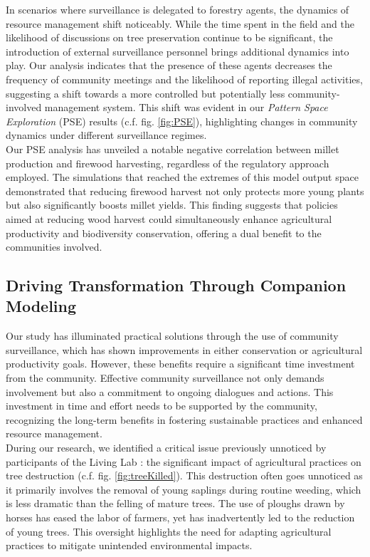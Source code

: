 \documentclass{article}
\begin{document}
In scenarios where surveillance is delegated to forestry agents, the dynamics of resource management shift noticeably. While the time spent in the field and the likelihood of discussions on tree preservation continue to be significant, the introduction of external surveillance personnel brings additional dynamics into play. Our analysis indicates that the presence of these agents decreases the frequency of community meetings and the likelihood of reporting illegal activities, suggesting a shift towards a more controlled but potentially less community-involved management system. This shift was evident in our \textit{Pattern Space Exploration} (PSE) results (c.f. fig. \ref{fig:PSE}), highlighting changes in community dynamics under different surveillance regimes.\\

Our PSE analysis has unveiled a notable negative correlation between millet production and firewood harvesting, regardless of the regulatory approach employed. The simulations that reached the extremes of this model output space demonstrated that reducing firewood harvest not only protects more young plants but also significantly boosts millet yields. This finding suggests that policies aimed at reducing wood harvest could simultaneously enhance agricultural productivity and biodiversity conservation, offering a dual benefit to the communities involved.\\

\subsection{Driving Transformation Through Companion Modeling}


Our study has illuminated practical solutions through the use of community surveillance, which has shown improvements in either conservation or agricultural productivity goals. However, these benefits require a significant time investment from the community. Effective community surveillance not only demands involvement but also a commitment to ongoing dialogues and actions. This investment in time and effort needs to be supported by the community, recognizing the long-term benefits in fostering sustainable practices and enhanced resource management.\\

During our research, we identified a critical issue previously unnoticed by participants of the Living Lab : the significant impact of agricultural practices on tree destruction (c.f. fig. \ref{fig:treeKilled}). This destruction often goes unnoticed as it primarily involves the removal of young saplings during routine weeding, which is less dramatic than the felling of mature trees. The use of ploughs drawn by horses has eased the labor of farmers, yet has inadvertently led to the reduction of young trees. This oversight highlights the need for adapting agricultural practices to mitigate unintended environmental impacts.\\
\end{document}
